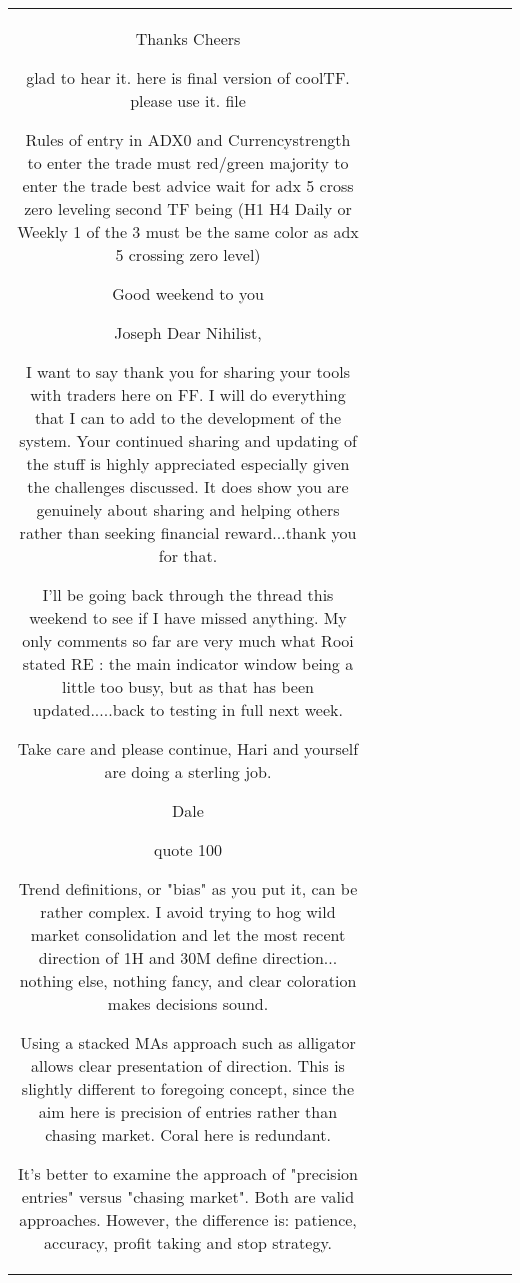 \begin{table}[h!]
\begin{tabular}{|c|c|c|c|c|c|c|c|c|c|}
Thanks
Cheers

glad to hear it. here is final version of coolTF. please use it. {file}

Rules of entry in ADX0 and Currencystrength to enter the trade must red/green majority to enter the trade best advice wait
for adx 5 cross zero leveling second TF being (H1 H4 Daily or Weekly 1 of the 3 must be the same color as adx 5 crossing zero level)

Good weekend to you

Joseph
Dear Nihilist,

I want to say thank you for sharing your tools with traders here on FF. I will do everything that I can to add to the development of the system.
Your continued sharing and updating of the stuff is highly appreciated especially given the challenges discussed. It does show you are genuinely about sharing and helping others rather than seeking financial reward...thank you for that.


I'll be going back through the thread this weekend to see if I have missed anything. My only comments so far are very much what Rooi stated RE : the main indicator window being a little too busy, but as that has been updated.....back to testing in full next week.

Take care and please continue, Hari and yourself are doing a sterling job.

Dale

{quote} 100%

Trend definitions, or "bias" as you put it, can be rather complex. I avoid trying to hog wild market consolidation and let the most recent direction of 1H and 30M define direction... nothing else, nothing fancy, and clear coloration makes decisions sound.

Using a stacked MAs approach such as alligator allows clear presentation of direction. This is slightly different to foregoing concept, since the aim here is precision of entries rather than chasing market. Coral here is redundant.

It's better to examine the approach of "precision entries" versus "chasing market". Both are valid approaches. However, the difference is: patience, accuracy, profit taking and stop strategy.


\end{tabular}
\end{table}
